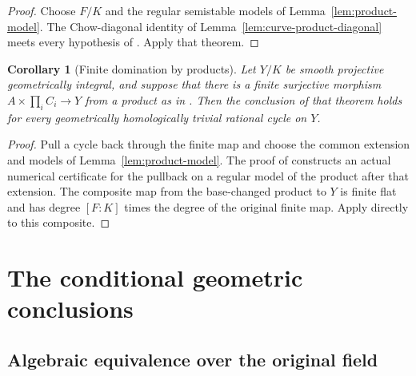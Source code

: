\documentclass[11pt]{article}
\newtheorem{corollary}[theorem]{Corollary}
\theoremstyle{definition}
\theoremstyle{remark}
\numberwithin{equation}{section}
\begin{document}
\begin{proof}
Choose $F/K$ and the regular semistable models of
Lemma~\ref{lem:product-model}.  The Chow-diagonal identity of
Lemma~\ref{lem:curve-product-diagonal} meets every hypothesis of
.  Apply that theorem.
\end{proof}

\begin{corollary}[Finite domination by products]
\label{cor:finite-curve-product}
Let $Y/K$ be smooth projective geometrically integral, and
suppose that there is a finite surjective morphism
$A\times\prod_i C_i\to Y$ from a product as in
.  Then the conclusion of that
theorem holds for every geometrically homologically trivial
rational cycle on $Y$.
\end{corollary}

\begin{proof}
Pull a cycle back through the finite map and choose the common
extension and models of Lemma~\ref{lem:product-model}.  The proof
of  constructs an actual
numerical certificate for the pullback on a regular model of
the product after that extension.  The composite map from
the base-changed product to $Y$ is finite flat and has degree
$[F:K]$ times the degree of the original finite map.  Apply
 directly to this composite.
\end{proof}



\section{The conditional geometric conclusions}\label{sec:conditional-conclusions}

\subsection{Algebraic equivalence over the original field}\label{sec:conditional-algebraic-proof}
\end{document}
